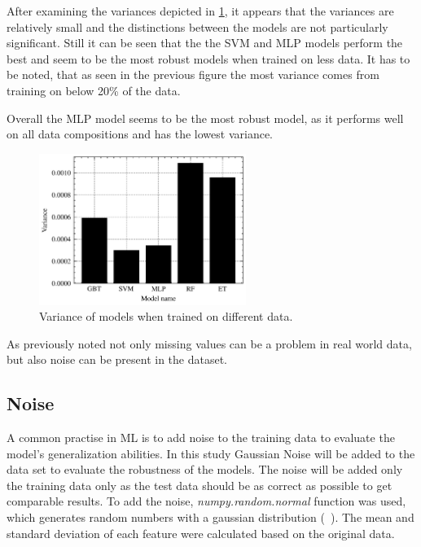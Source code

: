 After examining the variances depicted in \cref{fig:variance-missing-values}, it appears that the variances are
relatively small and the distinctions between the models are not particularly significant.
Still it can be seen that the the \ac{SVM} and \ac{MLP} models
perform the best and seem to be the most robust models when trained on less data.
It has to be noted, that as seen in the previous figure the most variance comes from training on
below 20\% of the data.

Overall the \ac{MLP} model seems to be the most robust model, as it performs well on all data
compositions and has the lowest variance.

\begin{figure}[h]
    \begin{tcolorbox}[arc=0pt,boxrule=0.5pt]
        \centering
        \includegraphics[width=0.6\textwidth]{chap5/images/variance_missing_values}
    \end{tcolorbox}
    \caption{Variance of models when trained on different data.}
    \label{fig:variance-missing-values}
\end{figure}

As previously noted not only missing values can be a problem in real world data, but also noise can be present in the
dataset.

\subsection{Noise}\label{subsec:noise}
A common practise in \ac{ML} is to add noise to the training data to evaluate
the model's generalization abilities.
In this study Gaussian Noise will be added to the data set to evaluate the robustness
of the models.
The noise will be added only the training data only as the test data should be as correct as possible to get
comparable results.
To add the noise, \textit{numpy.random.normal} function was used, which generates random numbers with a gaussian
distribution
(~\cite{harris2020array}).
The mean and standard deviation of each feature were calculated based on the original data.

